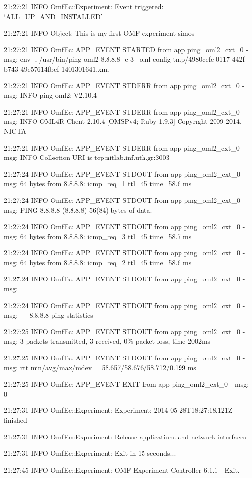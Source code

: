 \documentclass[letterpaper,10pt,english]{sphinxmanual}
\begin{document}
\begin{DUlineblock}{0em}
\item[] 21:27:21 INFO  OmfEc::Experiment: Event triggered: `ALL\_UP\_AND\_INSTALLED'
\item[] 21:27:21 INFO  Object: This is my first OMF experiment-simos
\item[] 21:27:21 INFO  OmfEc: APP\_EVENT STARTED from app ping\_oml2\_cxt\_0 - msg: env -i /usr/bin/ping-oml2  8.8.8.8 -c 3 --oml-config tmp/4980cefe-0117-442f-b743-49e57614fbcf-1401301641.xml
\item[] 21:27:21 INFO  OmfEc: APP\_EVENT STDERR from app ping\_oml2\_cxt\_0 - msg:  INFO ping-oml2: V2.10.4
\item[] 21:27:21 INFO  OmfEc: APP\_EVENT STDERR from app ping\_oml2\_cxt\_0 - msg: INFO   OML4R Client 2.10.4 {[}OMSPv4; Ruby 1.9.3{]} Copyright 2009-2014, NICTA
\item[] 21:27:21 INFO  OmfEc: APP\_EVENT STDERR from app ping\_oml2\_cxt\_0 - msg: INFO   Collection URI is tcp:nitlab.inf.uth.gr:3003
\item[] 21:27:24 INFO  OmfEc: APP\_EVENT STDOUT from app ping\_oml2\_cxt\_0 - msg: 64 bytes from 8.8.8.8: icmp\_req=1 ttl=45 time=58.6 ms
\item[] 21:27:24 INFO  OmfEc: APP\_EVENT STDOUT from app ping\_oml2\_cxt\_0 - msg: PING 8.8.8.8 (8.8.8.8) 56(84) bytes of data.
\item[] 21:27:24 INFO  OmfEc: APP\_EVENT STDOUT from app ping\_oml2\_cxt\_0 - msg: 64 bytes from 8.8.8.8: icmp\_req=3 ttl=45 time=58.7 ms
\item[] 21:27:24 INFO  OmfEc: APP\_EVENT STDOUT from app ping\_oml2\_cxt\_0 - msg: 64 bytes from 8.8.8.8: icmp\_req=2 ttl=45 time=58.6 ms
\item[] 21:27:24 INFO  OmfEc: APP\_EVENT STDOUT from app ping\_oml2\_cxt\_0 - msg:
\item[] 21:27:24 INFO  OmfEc: APP\_EVENT STDOUT from app ping\_oml2\_cxt\_0 - msg: --- 8.8.8.8 ping statistics ---
\item[] 21:27:25 INFO  OmfEc: APP\_EVENT STDOUT from app ping\_oml2\_cxt\_0 - msg: 3 packets transmitted, 3 received, 0\% packet loss, time 2002ms
\item[] 21:27:25 INFO  OmfEc: APP\_EVENT STDOUT from app ping\_oml2\_cxt\_0 - msg: rtt min/avg/max/mdev = 58.657/58.676/58.712/0.199 ms
\item[] 21:27:25 INFO  OmfEc: APP\_EVENT EXIT from app ping\_oml2\_cxt\_0 - msg: 0
\item[] 21:27:31 INFO  OmfEc::Experiment: Experiment: 2014-05-28T18:27:18.121Z finished
\item[] 21:27:31 INFO  OmfEc::Experiment: Release applications and network interfaces
\item[] 21:27:31 INFO  OmfEc::Experiment: Exit in 15 seconds...
\item[] 21:27:45 INFO  OmfEc::Experiment: OMF Experiment Controller 6.1.1 - Exit.
\end{DUlineblock}
\end{document}
